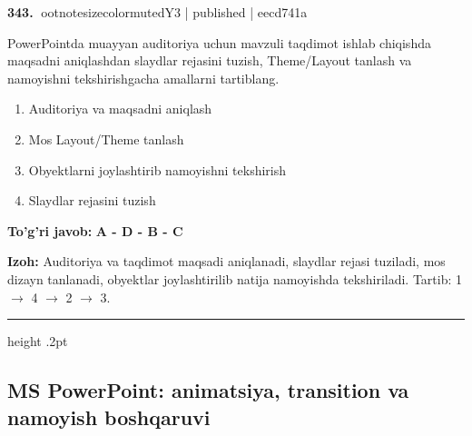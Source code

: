 \documentclass[10pt,a4paper]{article}
\begin{document}
\textbf{\color{ink}343.} {ootnotesizecolor{muted}Y3 | published | eecd741a}
\par
PowerPointda muayyan auditoriya uchun mavzuli taqdimot ishlab chiqishda maqsadni aniqlashdan slaydlar rejasini tuzish, Theme/Layout tanlash va namoyishni tekshirishgacha amallarni tartiblang.
\begin{enumerate}[label=\Alph*),leftmargin=9mm]
\item Auditoriya va maqsadni aniqlash
\item Mos Layout/Theme tanlash
\item Obyektlarni joylashtirib namoyishni tekshirish
\item Slaydlar rejasini tuzish
\end{enumerate}
\begin{tcolorbox}[enhanced,breakable,colback=teal!4,colframe=teal!55!black,boxrule=0.45pt,arc=1.2mm,left=2.8mm,right=2.8mm,top=2mm,bottom=2mm]
\textbf{\color{teal}To'g'ri javob:} \textbf{A - D - B - C}
\par\smallskip
\textbf{Izoh:} Auditoriya va taqdimot maqsadi aniqlanadi, slaydlar rejasi tuziladi, mos dizayn tanlanadi, obyektlar joylashtirilib natija namoyishda tekshiriladi. Tartib: 1 \ensuremath{\rightarrow} 4 \ensuremath{\rightarrow} 2 \ensuremath{\rightarrow} 3.
\end{tcolorbox}
\vspace{2mm}\hrule height .2pt\vspace{2mm}
\subsection{MS PowerPoint: animatsiya, transition va namoyish boshqaruvi}
\end{document}
